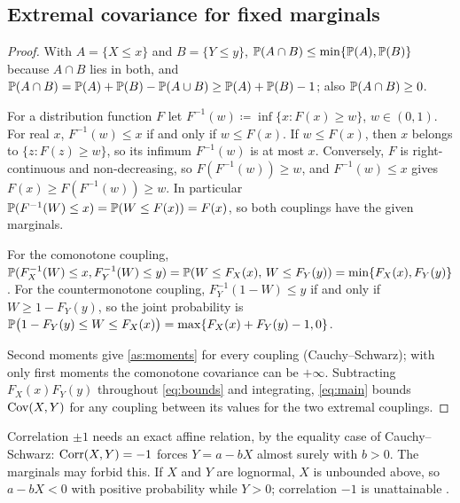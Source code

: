 \documentclass{saim-blog}
\begin{document}
\subsection{Extremal covariance for fixed marginals}
\begin{proof}
With $A=\{X\le x\}$ and $B=\{Y\le y\}$, $\mathbb{P}(A\cap B)\le\min\{\mathbb{P}(A),\mathbb{P}(B)\}$ because $A\cap B$ lies in both, and $\mathbb{P}(A\cap B)=\mathbb{P}(A)+\mathbb{P}(B)-\mathbb{P}(A\cup B)\ge\mathbb{P}(A)+\mathbb{P}(B)-1$; also $\mathbb{P}(A\cap B)\ge0$.

For a distribution function $F$ let $F^{-1}(w)\coloneqq\inf\{x:F(x)\ge w\}$, $w\in(0,1)$. For real $x$, $F^{-1}(w)\le x$ if and only if $w\le F(x)$. If $w\le F(x)$, then $x$ belongs to $\{z:F(z)\ge w\}$, so its infimum $F^{-1}(w)$ is at most $x$. Conversely, $F$ is right-continuous and non-decreasing, so $F(F^{-1}(w))\ge w$, and $F^{-1}(w)\le x$ gives $F(x)\ge F(F^{-1}(w))\ge w$. In particular $\mathbb{P}(F^{-1}(W)\le x)=\mathbb{P}(W\le F(x))=F(x)$, so both couplings have the given marginals.

For the comonotone coupling, $\mathbb{P}(F_X^{-1}(W)\le x,F_Y^{-1}(W)\le y)=\mathbb{P}(W\le F_X(x),\,W\le F_Y(y))=\min\{F_X(x),F_Y(y)\}$. For the countermonotone coupling, $F_Y^{-1}(1-W)\le y$ if and only if $W\ge1-F_Y(y)$, so the joint probability is $\mathbb{P}\big(1-F_Y(y)\le W\le F_X(x)\big)=\max\{F_X(x)+F_Y(y)-1,0\}$.

Second moments give \cref{as:moments} for every coupling (Cauchy--Schwarz); with only first moments the comonotone covariance can be $+\infty$. Subtracting $F_X(x)F_Y(y)$ throughout \eqref{eq:bounds} and integrating, \eqref{eq:main} bounds $\operatorname{Cov}(X,Y)$ for any coupling between its values for the two extremal couplings.
\end{proof}
Correlation $\pm1$ needs an exact affine relation, by the equality case of Cauchy--Schwarz: $\operatorname{Corr}(X,Y)=-1$ forces $Y=a-bX$ almost surely with $b>0$. The marginals may forbid this. If $X$ and $Y$ are lognormal, $X$ is unbounded above, so $a-bX<0$ with positive probability while $Y>0$; correlation $-1$ is unattainable \citep{embrechts2002}.
\end{document}
